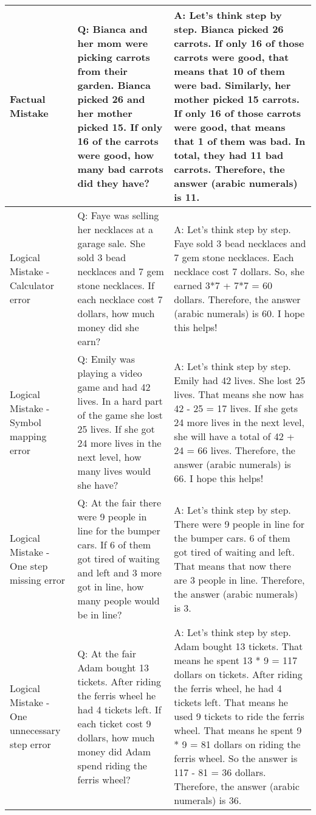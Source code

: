 \begin{center}
\begin{longtable}{|p{}|p{}|p{}|}
\midrule

Factual Mistake &Q: Bianca and her mom were picking carrots from their garden. Bianca picked 26 and her mother picked 15. If only 16 of the carrots were good, how many bad carrots did they have? &A: Let's think step by step. Bianca picked 26 carrots. If only 16 of those carrots were good, that means that 10 of them were bad. Similarly, her mother picked 15 carrots. If only 16 of those carrots were good, that means that 1 of them was bad. In total, they had 11 bad carrots. Therefore, the answer (arabic numerals) is 11. \\

\midrule

Logical Mistake - Calculator error &Q: Faye was selling her necklaces at a garage sale. She sold 3 bead necklaces and 7 gem stone necklaces. If each necklace cost 7 dollars, how much money did she earn? &A: Let's think step by step. Faye sold 3 bead necklaces and 7 gem stone necklaces. Each necklace cost 7 dollars. So, she earned 3*7 + 7*7 = 60 dollars. Therefore, the answer (arabic numerals) is 60. I hope this helps! \\

\midrule

Logical Mistake - Symbol mapping error &Q: Emily was playing a video game and had 42 lives. In a hard part of the game she lost 25 lives. If she got 24 more lives in the next level, how many lives would she have? &A: Let's think step by step. Emily had 42 lives. She lost 25 lives. That means she now has 42 - 25 = 17 lives. If she gets 24 more lives in the next level, she will have a total of 42 + 24 = 66 lives. Therefore, the answer (arabic numerals) is 66. I hope this helps! \\

\midrule

Logical Mistake - One step missing error &Q: At the fair there were 9 people in line for the bumper cars. If 6 of them got tired of waiting and left and 3 more got in line, how many people would be in line? &A: Let's think step by step. There were 9 people in line for the bumper cars. 6 of them got tired of waiting and left. That means that now there are 3 people in line. Therefore, the answer (arabic numerals) is 3. \\

\midrule

Logical Mistake - One unnecessary step error &Q: At the fair Adam bought 13 tickets. After riding the ferris wheel he had 4 tickets left. If each ticket cost 9 dollars, how much money did Adam spend riding the ferris wheel? &A: Let's think step by step. Adam bought 13 tickets. That means he spent 13 * 9 = 117 dollars on tickets. After riding the ferris wheel, he had 4 tickets left. That means he used 9 tickets to ride the ferris wheel. That means he spent 9 * 9 = 81 dollars on riding the ferris wheel. So the answer is 117 - 81 = 36 dollars. Therefore, the answer (arabic numerals) is 36. \\


\end{longtable}
\end{center}
